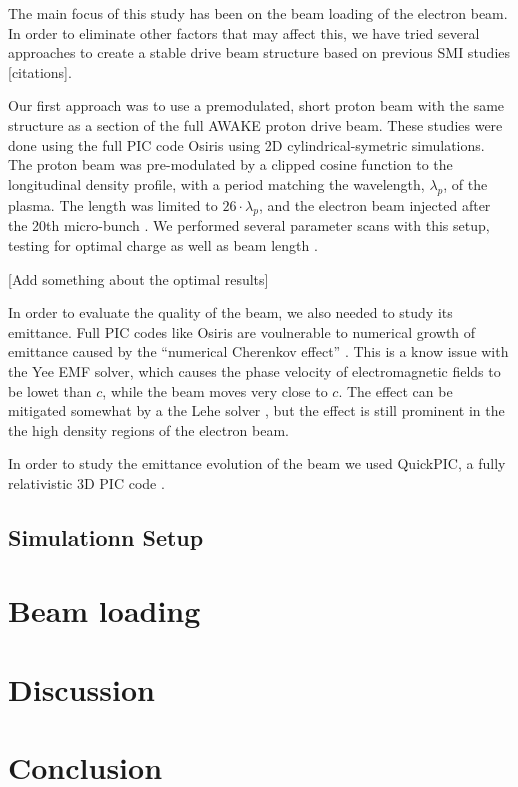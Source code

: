 \documentclass[aps,prstab,reprint,amsmath,amssymb,groupedaddress]{revtex4-1}
\begin{document}
The main focus of this study has been on the beam loading of the electron beam. In order to eliminate other factors that
may affect this, we have tried several approaches to create a stable drive beam structure based on previous SMI studies
[citations].

Our first approach was to use a premodulated, short proton beam with the same structure as a section of the full AWAKE
proton drive beam. These studies were done using the full PIC code Osiris \cite{fonseca:2002} using 2D
cylindrical-symetric simulations. The proton beam was pre-modulated by a clipped cosine function to the longitudinal
density profile, with a period matching the wavelength, $\lambda_p$, of the plasma. The length was limited to
$26\cdot\lambda_p$, and the electron beam injected after the 20th micro-bunch \cite{berglyd_olsen:2015}. We performed
several parameter scans with this setup, testing for optimal charge as well as beam length
\cite{adli:2016, berglyd_olsen:2016}.

[Add something about the optimal results]

In order to evaluate the quality of the beam, we also needed to study its emittance. Full PIC codes like Osiris are
voulnerable to numerical growth of emittance caused by the ``numerical Cherenkov effect'' \cite{godfrey:1974}. This is a
know issue with the Yee EMF solver, which causes the phase velocity of electromagnetic fields to be lowet than $c$,
while the beam moves very close to $c$. The effect can be mitigated somewhat by a the Lehe solver \cite{lehe:2013}, but
the effect is still prominent in the the high density regions of the electron beam.

In order to study the emittance evolution of the beam we used QuickPIC, a fully relativistic 3D PIC code
\cite{huang:2006, an:2013}.

\subsection[\label{S:M:Setup}]{Simulationn Setup}



\section[\label{S:BL}]{Beam loading}


\section[\label{S:D}]{Discussion}
\section[\label{S:C}]{Conclusion}




\end{document}
